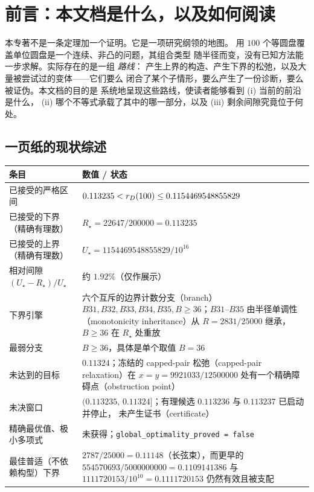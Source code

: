 \section*{前言：本文档是什么，以及如何阅读}

本专著不是一条定理加一个证明。它是一项研究纲领的地图。
用 $100$ 个等圆盘覆盖单位圆盘是一个连续、非凸的问题，其组合类型
随半径而变，没有已知方法能一步求解。实际存在的是一组 \emph{路线}：
产生上界的构造、产生下界的松弛，以及大量被尝试过的变体——它们要么
闭合了某个子情形，要么产生了一份诊断，要么被证伪。本文档的目的是
系统地呈现这些路线，使读者能够看到 (i) 当前的前沿是什么，
(ii) 哪个不等式承载了其中的哪一部分，以及 (iii) 剩余间隙究竟位于何处。

\subsection*{一页纸的现状综述}

\begin{center}
\footnotesize
\begin{tabular}{@{}>{\raggedright\arraybackslash}p{}>{\raggedright\arraybackslash}p{}@{}}
\toprule
条目 & 数值 / 状态 \\
\midrule
已接受的严格区间 &
$0.113235<r_{D}(100)\le 0.1154469548855829$ \\[1mm]
已接受的下界（精确有理数） &
$R_\star=22647/200000=0.113235$ \\[1mm]
已接受的上界（精确有理数） &
$U_\star=1154469548855829/10^{16}$ \\[1mm]
相对间隙 $(U_\star-R_\star)/U_\star$ &
约 $1.92\%$（仅作展示） \\[1mm]
下界引擎 &
六个互斥的边界计数分支（branch）
$B31,B32,B33,B34,B35,B{\ge}36$；$B31$--$B35$ 由半径单调性（monotonicity inheritance）从 $R=2831/25000$ 继承，$B{\ge}36$ 在 $R_\star$ 处重放 \\[1mm]
最弱分支 &
$B\ge 36$，具体是单个取值 $B=36$ \\[1mm]
未达到的目标 &
$0.11324$；冻结的 capped-pair 松弛（capped-pair relaxation）在
$x=y=9921033/12500000$ 处有一个精确障碍点（obstruction point） \\[1mm]
未决窗口 &
$(0.113235,\,0.11324]$；有理候选 $0.113236$ 与 $0.113237$ 已启动并停止，
未产生证书（certificate） \\[1mm]
精确最优值、极小多项式 &
未获得；\texttt{global\_\allowbreak{}optimality\_\allowbreak{}proved = false} \\[1mm]
最佳普适（不依赖构型）下界 &
$2787/25000=0.11148$（长弦束），而更早的
$554570693/5000000000=0.1109141386$ 与
$1111720153/10^{10}=0.1111720153$ 仍然有效且被支配 \\
\bottomrule
\end{tabular}
\end{center}


